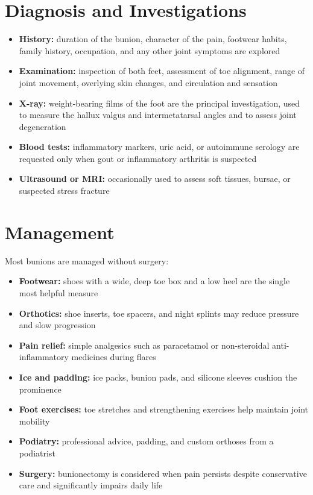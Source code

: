 \section*{Diagnosis and Investigations}
\begin{itemize}
    \item \textbf{History:} duration of the bunion, character of the pain, footwear habits, family history, occupation, and any other joint symptoms are explored
    \item \textbf{Examination:} inspection of both feet, assessment of toe alignment, range of joint movement, overlying skin changes, and circulation and sensation
    \item \textbf{X-ray:} weight-bearing films of the foot are the principal investigation, used to measure the hallux valgus and intermetatarsal angles and to assess joint degeneration
    \item \textbf{Blood tests:} inflammatory markers, uric acid, or autoimmune serology are requested only when gout or inflammatory arthritis is suspected
    \item \textbf{Ultrasound or MRI:} occasionally used to assess soft tissues, bursae, or suspected stress fracture
\end{itemize}

\section*{Management}
Most bunions are managed without surgery:
\begin{itemize}
    \item \textbf{Footwear:} shoes with a wide, deep toe box and a low heel are the single most helpful measure
    \item \textbf{Orthotics:} shoe inserts, toe spacers, and night splints may reduce pressure and slow progression
    \item \textbf{Pain relief:} simple analgesics such as paracetamol or non-steroidal anti-inflammatory medicines during flares
    \item \textbf{Ice and padding:} ice packs, bunion pads, and silicone sleeves cushion the prominence
    \item \textbf{Foot exercises:} toe stretches and strengthening exercises help maintain joint mobility
    \item \textbf{Podiatry:} professional advice, padding, and custom orthoses from a podiatrist
    \item \textbf{Surgery:} bunionectomy is considered when pain persists despite conservative care and significantly impairs daily life
\end{itemize}

